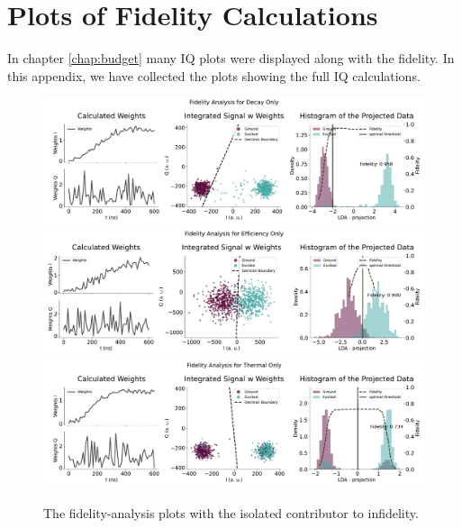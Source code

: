 \chapter{Plots of Fidelity Calculations}\label{chap:IQ_plots}
In chapter \ref{chap:budget} many IQ plots were displayed along with the fidelity. In this appendix, we have collected the plots showing the full IQ calculations.

\begin{figure}[h]
    \centering
    \includegraphics{Simulations/budgets/figures/decay_only_sme.pdf}
    \includegraphics{Simulations/budgets/figures/efficiency_only_sme.pdf}
    \includegraphics{Simulations/budgets/figures/thermal_only_sme.pdf}
    \caption{The fidelity-analysis plots with the isolated contributor to infidelity.}
    \label{fig:enter-label}
\end{figure}

